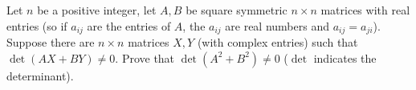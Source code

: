 Let $n$ be a positive integer, let $A, B$ be square symmetric $n \times n$
matrices with real entries (so if $a_{ij}$ are the entries of $A$, the $a_{ij}$
are real numbers and $a_{ij} = a_{ji}$). Suppose there are $n \times n$
matrices $X, Y$ (with complex entries) such that $\det(AX + BY) \ne 0$. Prove
that $\det(A^2 + B^2) \ne 0$ ($\det$ indicates the determinant).
